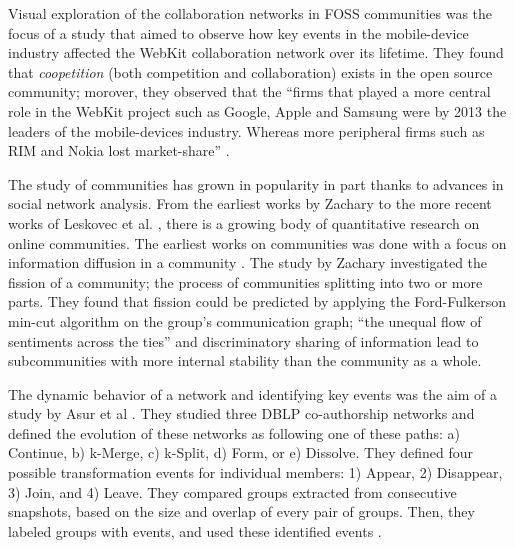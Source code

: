 \documentclass[11pt]{report}
\begin{document}
Visual exploration of the collaboration networks in FOSS communities was the focus of a study that aimed to observe how key events in the mobile-device industry affected the WebKit collaboration network over its lifetime. \cite{JoseWebKit} They found that \textit{coopetition} (both competition and collaboration) exists in the open source community; morover, they observed that the ``firms that played a more central role in the WebKit project such as Google, Apple and Samsung were by 2013 the leaders of the mobile-devices industry. Whereas more peripheral firms such as RIM and Nokia lost market-share'' \cite{JoseWebKit}. 

The study of communities has grown in popularity in part thanks to advances in social network analysis.  From the earliest works by Zachary \cite{Zachary} to the more recent works of Leskovec et al. \cite{LeskovecGraphsOverTime}\cite{LeskovecStatisticalPropertiesOfCommunityStructure}, there is a growing body of quantitative research on online communities. The earliest works on communities was done with a focus on information diffusion in a community \cite{Zachary}. The study by Zachary investigated the fission of a community; the process of communities splitting into two or more parts. They found that fission could be predicted by applying the Ford-Fulkerson min-cut algorithm \cite{Ford} on the group's communication graph; ``the unequal flow of sentiments across the ties'' and discriminatory sharing of information lead to subcommunities with more internal stability than the community as a whole.\cite{Zachary}

The dynamic behavior of a network and identifying key events was the aim of a study by Asur et al \cite{Asur}. They studied three DBLP co-authorship networks and defined the evolution of these networks as following one of these paths: a) Continue, b) k-Merge, c) k-Split, d) Form, or e) Dissolve. They defined four possible transformation events for individual members: 1) Appear, 2) Disappear, 3) Join, and 4) Leave. They compared groups extracted from consecutive snapshots, based on the size and overlap of every pair of groups. Then, they labeled groups with events, and used these identified events \cite{Asur}.
\end{document}
